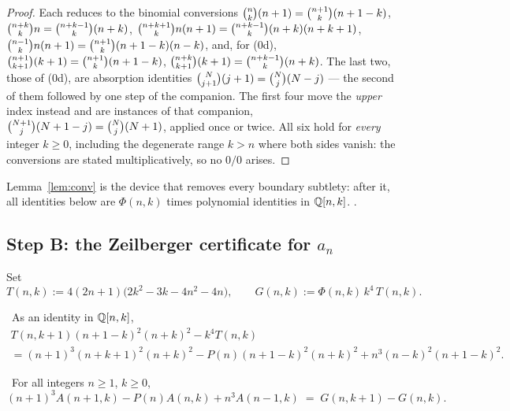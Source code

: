 \begin{proof}
Each reduces to the binomial conversions
$\binom{n}{k}(n+1)=\binom{n+1}{k}(n+1-k)$, $\binom{n+k}{k}n=\binom{n+k-1}{k}(n+k)$,
$\binom{n+k+1}{k}n(n+1)=\binom{n+k-1}{k}(n+k)(n+k+1)$,
$\binom{n-1}{k}n(n+1)=\binom{n+1}{k}(n+1-k)(n-k)$, and, for (0d),
$\binom{n+1}{k+1}(k+1)=\binom{n+1}{k}(n+1-k)$, $\binom{n+k}{k+1}(k+1)=\binom{n+k-1}{k}(n+k)$. The last
two, those of (0d), are absorption identities $\binom{N}{j+1}(j+1)=\binom{N}{j}(N-j)$ --- the second of
them followed by one step of the companion. The first four move the \emph{upper} index instead
and are instances of that companion, $\binom{N+1}{j}(N+1-j)=\binom{N}{j}(N+1)$, applied once or twice.
All six hold for
\emph{every} integer $k\ge0$, including the degenerate range $k>n$ where both sides
vanish: the conversions are stated multiplicatively, so no $0/0$ arises.
\end{proof}

Lemma~\ref{lem:conv} is the device that removes every boundary subtlety: after it, all
identities below are $\Phi(n,k)$ times polynomial identities in $\mathbb{Q}[n,k]$.
.

\subsection{Step B: the Zeilberger certificate for \texorpdfstring{$a_n$}{a\_n}}

Set
\begin{equation}\label{eq:TG}
   T(n,k):=4(2n+1)\bigl(2k^2-3k-4n^2-4n\bigr),
   \qquad
   G(n,k):=\Phi(n,k)\,k^4\,T(n,k).
\end{equation}

\begin{lemma}[CERT-1]\label{lem:cert1}
\Proved\ As an identity in $\mathbb{Q}[n,k]$,
\begin{multline*}
  T(n,k+1)(n+1-k)^2(n+k)^2-k^4T(n,k)\\
  =(n+1)^3(n+k+1)^2(n+k)^2-P(n)(n+1-k)^2(n+k)^2+n^3(n-k)^2(n+1-k)^2 .
\end{multline*}
\end{lemma}

\begin{proposition}\label{prop:B}
\Proved\ For all integers $n\ge1$, $k\ge0$,
\begin{equation}\label{eq:dagger}
   (n+1)^3A(n+1,k)-P(n)A(n,k)+n^3A(n-1,k)\;=\;G(n,k+1)-G(n,k).
\end{equation}
\end{proposition}


